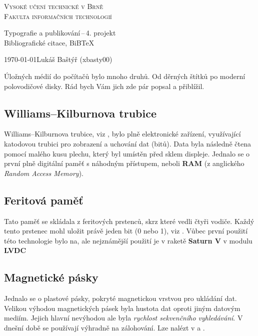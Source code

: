 \documentclass[11pt]{article}
\begin{document}
    \begin{titlepage}
        \begin{center}
            \Huge \textsc{Vysoké učení technické v Brně}\\
            \huge \textsc{Fakulta informačních technologií}

            \LARGE Typografie a publikování\,--\,4. projekt \\
            \Huge Bibliografické citace, BiBTeX
        \end{center}
        \Large \today \hfill Lukáš Baštýř (xbasty00)
    \end{titlepage}
    
        Úložných médií do počítačů bylo mnoho druhů. Od děrných štítků po moderní polovodičové disky. Rád bych Vám jich zde pár popsal a přiblížil.
    
    \subsection*{Williams–Kilburnova trubice}
    Williams–Kilburnova trubice, viz \cite{CopelandBJack2011TMCA}, bylo plně elektronické zařízení, využívající katodovou trubici pro zobrazení a uchování dat (bitů). Data byla následně čtena pomocí malého kusu plechu, který byl umístěn před sklem displeje. Jednalo se o první plně digitální paměť s náhodným přístupem, neboli \textbf{RAM} (z anglického \emph{Random Access Memory}).
    \subsection*{Feritová paměť}
    Tato paměť se skládala z feritových prstenců, skrz které vedli čtyři vodiče. Každý tento prstenec mohl uložit právě jeden bit (0 nebo 1), viz \cite{mcm}. Vůbec první použití této technologie bylo na, ale nejznámější použití je v raketě \textbf{Saturn V} \cite{SaturnVFM} v modulu \textbf{LVDC} \cite{KuehnRalphE1969CRDP}
    
    \subsection*{Magnetické pásky}
    Jednalo se o plastové pásky, pokryté magnetickou vrstvou pro ukládání dat. Velikou výhodou magnetických pásek byla hustota dat oproti jiným datovým mediím. Jejich hlavní nevýhodou ale byla \emph{rychlost sekvenčního vyhledávání}. V dnešní době se používají výhradně na zálohování. Lze nalézt v \cite {PsotaMarek2010Zdhs} a \cite{WMP}.
    
\end{document}

